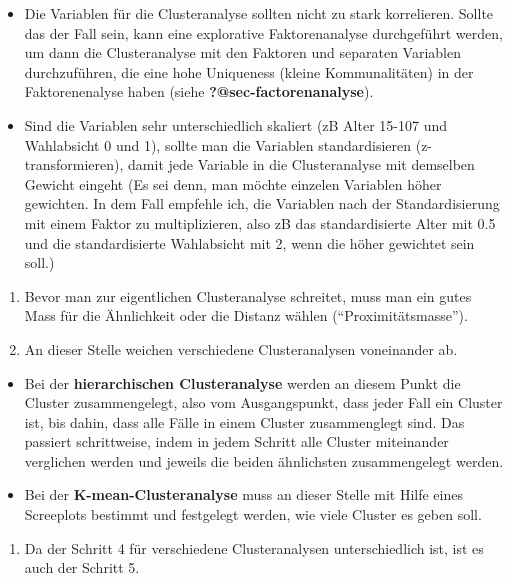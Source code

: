 \documentclass[
  10pt,
  letterpaper,
  a4paper, twoside]{scrreprt}
\providecommand{\tightlist}{%
  \setlength{\itemsep}{0pt}\setlength{\parskip}{0pt}}\usepackage{longtable,booktabs,array}
\begin{document}
\begin{itemize}
\tightlist
\item
  Die Variablen für die Clusteranalyse sollten nicht zu stark
  korrelieren. Sollte das der Fall sein, kann eine explorative
  Faktorenanalyse durchgeführt werden, um dann die Clusteranalyse mit
  den Faktoren und separaten Variablen durchzuführen, die eine hohe
  Uniqueness (kleine Kommunalitäten) in der Faktorenenalyse haben (siehe
  \textbf{?@sec-factorenanalyse}).
\item
  Sind die Variablen sehr unterschiedlich skaliert (zB Alter 15-107 und
  Wahlabsicht 0 und 1), sollte man die Variablen standardisieren
  (z-transformieren), damit jede Variable in die Clusteranalyse mit
  demselben Gewicht eingeht (Es sei denn, man möchte einzelen Variablen
  höher gewichten. In dem Fall empfehle ich, die Variablen nach der
  Standardisierung mit einem Faktor zu multiplizieren, also zB das
  standardisierte Alter mit 0.5 und die standardisierte Wahlabsicht mit
  2, wenn die höher gewichtet sein soll.)
\end{itemize}

\begin{enumerate}
\def\labelenumi{\arabic{enumi}.}
\setcounter{enumi}{2}
\item
  Bevor man zur eigentlichen Clusteranalyse schreitet, muss man ein
  gutes Mass für die Ähnlichkeit oder die Distanz wählen
  (\enquote{Proximitätsmasse}).
\item
  An dieser Stelle weichen verschiedene Clusteranalysen voneinander ab.
\end{enumerate}

\begin{itemize}
\tightlist
\item
  Bei der \textbf{hierarchischen Clusteranalyse} werden an diesem Punkt
  die Cluster zusammengelegt, also vom Ausgangspunkt, dass jeder Fall
  ein Cluster ist, bis dahin, dass alle Fälle in einem Cluster
  zusammenglegt sind. Das passiert schrittweise, indem in jedem Schritt
  alle Cluster miteinander verglichen werden und jeweils die beiden
  ähnlichsten zusammengelegt werden.
\item
  Bei der \textbf{K-mean-Clusteranalyse} muss an dieser Stelle mit Hilfe
  eines Screeplots bestimmt und festgelegt werden, wie viele Cluster es
  geben soll.
\end{itemize}

\begin{enumerate}
\def\labelenumi{\arabic{enumi}.}
\setcounter{enumi}{4}
\tightlist
\item
  Da der Schritt 4 für verschiedene Clusteranalysen unterschiedlich ist,
  ist es auch der Schritt 5.
\end{enumerate}
\end{document}
